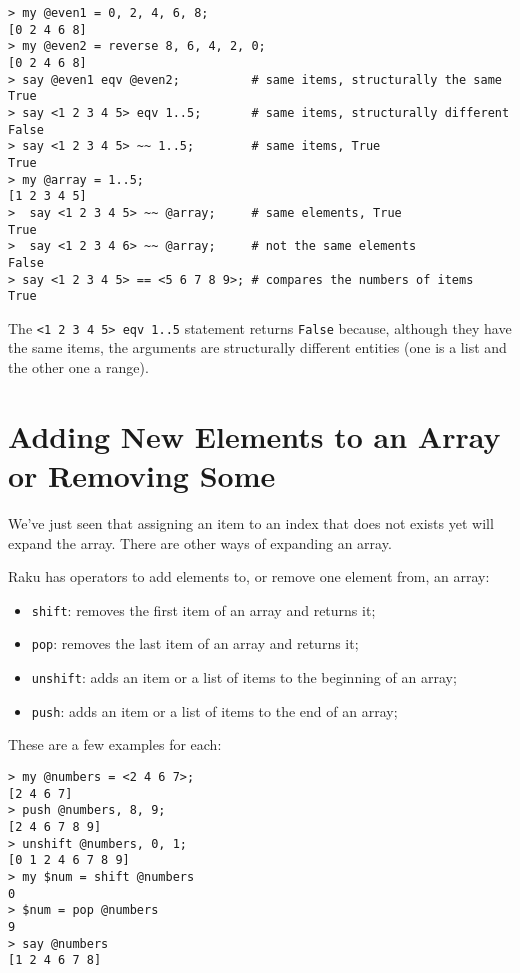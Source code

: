 \begin{verbatim}
> my @even1 = 0, 2, 4, 6, 8;
[0 2 4 6 8]
> my @even2 = reverse 8, 6, 4, 2, 0;
[0 2 4 6 8]
> say @even1 eqv @even2;          # same items, structurally the same
True
> say <1 2 3 4 5> eqv 1..5;       # same items, structurally different
False
> say <1 2 3 4 5> ~~ 1..5;        # same items, True
True
> my @array = 1..5;               
[1 2 3 4 5]
>  say <1 2 3 4 5> ~~ @array;     # same elements, True
True
>  say <1 2 3 4 6> ~~ @array;     # not the same elements
False
> say <1 2 3 4 5> == <5 6 7 8 9>; # compares the numbers of items
True
\end{verbatim}

The \verb'<1 2 3 4 5> eqv 1..5' statement returns \verb'False' because, 
although they have the same items, the arguments are structurally 
different entities (one is a list and the other one a range).

\section{Adding New Elements to an Array or Removing Some}

We've just seen that assigning an item to an index that does 
not exists yet will expand the array. There are other 
ways of expanding an array.

Raku has operators to add elements to, or remove one element 
from, an array:

\begin{itemize}
\item {\tt shift}: removes the first item of an array and returns it;
\item {\tt pop}: removes the last item of an array and returns it;
\item {\tt unshift}: adds an item or a list of items to the 
beginning of an array;
\item {\tt push}: adds an item or a list of items to the 
end of an array;
\end{itemize}

These are a few examples for each:

\begin{verbatim}
> my @numbers = <2 4 6 7>;
[2 4 6 7]
> push @numbers, 8, 9;
[2 4 6 7 8 9]
> unshift @numbers, 0, 1;
[0 1 2 4 6 7 8 9]
> my $num = shift @numbers
0
> $num = pop @numbers
9
> say @numbers
[1 2 4 6 7 8]
\end{verbatim}


